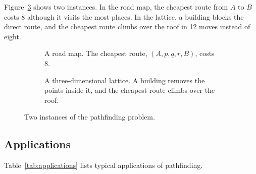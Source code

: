 Figure~\ref{fig:pathfinding} shows two instances. In the road map, the cheapest
route from $A$ to $B$ costs 8 although it visits the most places. In the
lattice, a building blocks the direct route, and the cheapest route climbs over
the roof in 12 moves instead of eight.

\begin{figure}[htbp]
  \centering
  \begin{subfigure}[b]{0.40\textwidth}\centering
    \par\vspace{6pt}
    \caption{A road map. The cheapest route, $(A, p, q, r, B)$,
      costs 8.}\label{fig:pf-graph}
  \end{subfigure}\hfill
  \begin{subfigure}[b]{0.56\textwidth}\centering
    
    \caption{A three-dimensional lattice. A building removes the points inside
      it, and the cheapest route climbs over the roof.}\label{fig:pf-3d}
  \end{subfigure}
  \caption{Two instances of the pathfinding problem.}\label{fig:pathfinding}
\end{figure}

\subsection{Applications}\label{sec:applications}

Table~\ref{tab:applications} lists typical applications of pathfinding.

